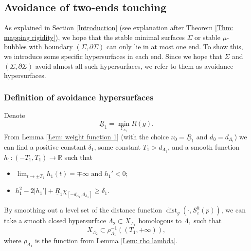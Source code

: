 \documentclass[11pt,letterpaper]{amsart}
\numberwithin{equation}{section}
\theoremstyle{definition}
\DeclareMathOperator{\dist}{dist}
\newcommand{\ve}{\varepsilon}
\begin{document}
\subsection{Avoidance of two-ends touching}\label{Avoidance of two-ends touching}
As explained in Section \ref{Introduction} (see explanation after Theorem \ref{Thm: mapping rigidity}), we hope that the stable minimal surfaces $\Sigma$ or stable $\mu$-bubbles with boundary $(\Sigma,\partial\Sigma)$ can only lie in at most one end. To show this, we introduce some specific hypersurfaces in each end. Since we hope that $\Sigma$ and $(\Sigma,\partial\Sigma)$ avoid almost all such hypersurfaces, we refer to them as avoidance hypersurfaces.

\subsubsection{Definition of avoidance hypersurfaces}\label{Definition of avoidance hypersurfaces}
Denote
$$\underline R_1=\min_{Y_{\Lambda_1}} R(g).$$
From Lemma \ref{Lem: weight function 1} (with the choice $\nu_0=\underline R_1$ and $d_0=d_{\Lambda_1}$) we can find a positive constant $\delta_1$, some constant $T_1>d_{\Lambda_1}$, and a smooth function $h_1:(-T_1,T_1)\to \mathbb R$ such that
\begin{itemize}\setlength{\itemsep}{1mm}
\item $\lim_{t\to\pm T_1}h_1(t)=\mp\infty$ and $h_1'<0$;
\item $h_1^2-2|h_1'|+\underline R_1\chi_{[-d_{\Lambda_1},d_{\Lambda_1}]}\geq \delta_1$.
\end{itemize}
By smoothing out a level set of the distance function $\dist_g(\cdot, S^h_{\ve}(p))$, we can take a smooth closed hypersurface $\Lambda_2 \subset X_{\Lambda_1}$ homologous to $\Lambda_1$ such that
\begin{equation}\label{construction Lambda 2}
X_{\Lambda_2}\subset \rho_{\Lambda_1}^{-1}((T_1,+\infty)),
\end{equation}
where $\rho_{\Lambda_1}$ is the function from Lemma \ref{Lem: rho lambda}.
\end{document}
